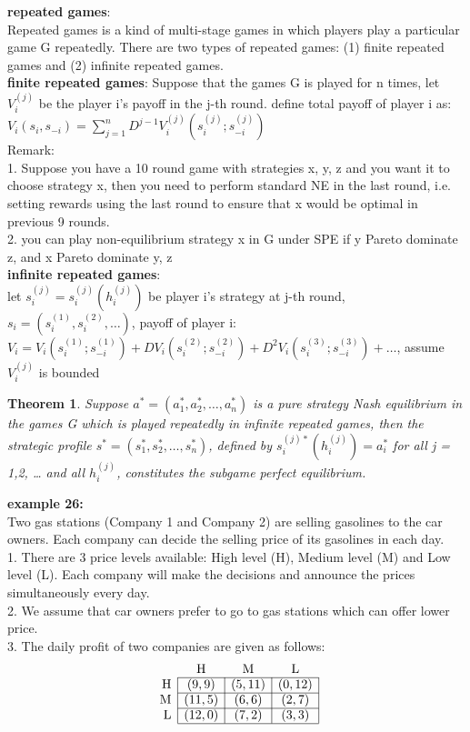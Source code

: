 \documentclass[twoside]{article}
\theoremstyle{definitionstyle}
\newtheorem*{theorem}{Theorem}
\begin{document}
%
%
%
\textbf{repeated games}:\\
Repeated games is a kind of multi-stage games in which players play a 
particular game G repeatedly.  There are two types of repeated games: (1) finite repeated games and (2) infinite repeated games. \\
\newline
\textbf{finite repeated games}: Suppose that the games G is played for n times, let $V_i^{(j)}$ be the player i's 
payoff in the j-th round. define total payoff of player i as: $V_i(s_i, s_{-i})=\sum_{j=1}^nD^{j-1}V_i^{(j)}(s_i^{(j)}; s_{-i}^{(j)})$\\
Remark:\\
1. Suppose you have a 10 round game with strategies x, y, z and you want it to choose strategy x, then you need to perform standard NE in the last round, i.e. setting rewards using the last round to ensure that x would be optimal in previous 9 rounds.\\
2. you can play non-equilibrium strategy x in G under SPE if y Pareto dominate z, and x Pareto dominate y, z\\
\newline
\textbf{infinite repeated games}:\\
let $s_i^{(j)} = s_i^{(j)}(h_i^{(j)})$ be player i's strategy at j-th round, $s_i = (s_i^{(1)}, s_i^{(2)}, \ldots)$, payoff of player i: $V_i = V_i(s_i^{(1)}; s_{-i}^{(1)}) + DV_i(s_i^{(2)}; s_{-i}^{(2)})+ D^2V_i(s_i^{(3)};s_{-i}^{(3)}) + \ldots$, assume $V_i^{(j)}$ is bounded\\
\begin{theorem}
  Suppose $a^* = (a_1^*, a_2^*, \ldots, a_n^*)$ is a pure strategy Nash equilibrium in the games G which is played repeatedly in infinite repeated games, then the 
strategic profile $s^* = (s_1^*, s_2^*, \ldots, s_n^*)$, defined by $s_i^{(j)*}(h_i^{(j)}) = a_i^*$ for all 
j = 1,2, … and all $h_i^{(j)}$, constitutes the subgame perfect equilibrium. 
\end{theorem}
\textbf{example 26:}\\
Two gas stations (Company 1 and Company 2) are selling gasolines to the car owners. Each company can decide the selling price of its gasolines in each day.\\
1. There are 3 price levels available: High level (H), Medium level (M) and Low level (L). Each company will make the decisions and announce the prices simultaneously every day.\\
2. We assume that car owners prefer to go to gas stations which can offer lower price.\\
3. The daily profit of two companies are given as follows:
    \[
    \begin{array}{r|c|c|c|}
    \multicolumn{1}{r}{} & \multicolumn{1}{c}{\text{H}} & \multicolumn{1}{c}{\text{M}} & \multicolumn{1}{c}{\text{L}} \\ \cline{2-4}
    \text{H} & (9,9) & (5,11) & (0,12) \\ \cline{2-4}
    \text{M} & (11,5) & (6,6) & (2,7) \\ \cline{2-4}
    \text{L} & (12,0) & (7,2) & (3,3) \\ \cline{2-4}
    \end{array}
    \]
\end{document}
